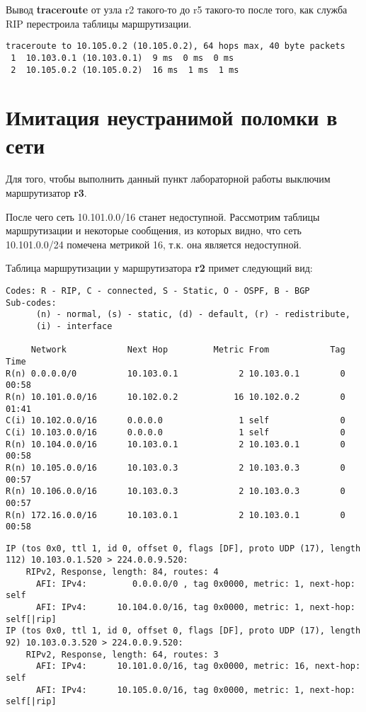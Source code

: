 \documentclass[a4paper,12pt]{article}
\begin{document}
Вывод \textbf{traceroute} от узла r2 такого-то до r5 такого-то после того, как служба RIP перестроила таблицы маршрутизации.
\begin{Verbatim}
traceroute to 10.105.0.2 (10.105.0.2), 64 hops max, 40 byte packets
 1  10.103.0.1 (10.103.0.1)  9 ms  0 ms  0 ms
 2  10.105.0.2 (10.105.0.2)  16 ms  1 ms  1 ms
\end{Verbatim}

\section{Имитация неустранимой поломки в сети}

Для того, чтобы выполнить данный пункт лабораторной работы выключим
маршрутизатор \textbf{r3}.

После чего сеть 10.101.0.0/16 станет недоступной. Рассмотрим таблицы
маршрутизации и некоторые сообщения, из которых видно, что сеть 10.101.0.0/24
помечена метрикой 16, т.к. она является недоступной.

Таблица маршрутизации у маршрутизатора \textbf{r2} примет следующий вид:

\begin{Verbatim}
Codes: R - RIP, C - connected, S - Static, O - OSPF, B - BGP
Sub-codes:
      (n) - normal, (s) - static, (d) - default, (r) - redistribute,
      (i) - interface

     Network            Next Hop         Metric From            Tag Time
R(n) 0.0.0.0/0          10.103.0.1            2 10.103.0.1        0 00:58
R(n) 10.101.0.0/16      10.102.0.2           16 10.102.0.2        0 01:41
C(i) 10.102.0.0/16      0.0.0.0               1 self              0
C(i) 10.103.0.0/16      0.0.0.0               1 self              0
R(n) 10.104.0.0/16      10.103.0.1            2 10.103.0.1        0 00:58
R(n) 10.105.0.0/16      10.103.0.3            2 10.103.0.3        0 00:57
R(n) 10.106.0.0/16      10.103.0.3            2 10.103.0.3        0 00:57
R(n) 172.16.0.0/16      10.103.0.1            2 10.103.0.1        0 00:58
\end{Verbatim}

\begin{Verbatim}
IP (tos 0x0, ttl 1, id 0, offset 0, flags [DF], proto UDP (17), length 112) 10.103.0.1.520 > 224.0.0.9.520: 
	RIPv2, Response, length: 84, routes: 4
	  AFI: IPv4:         0.0.0.0/0 , tag 0x0000, metric: 1, next-hop: self
	  AFI: IPv4:      10.104.0.0/16, tag 0x0000, metric: 1, next-hop: self[|rip]
IP (tos 0x0, ttl 1, id 0, offset 0, flags [DF], proto UDP (17), length 92) 10.103.0.3.520 > 224.0.0.9.520: 
	RIPv2, Response, length: 64, routes: 3
	  AFI: IPv4:      10.101.0.0/16, tag 0x0000, metric: 16, next-hop: self
	  AFI: IPv4:      10.105.0.0/16, tag 0x0000, metric: 1, next-hop: self[|rip]
\end{Verbatim}
\end{document}

